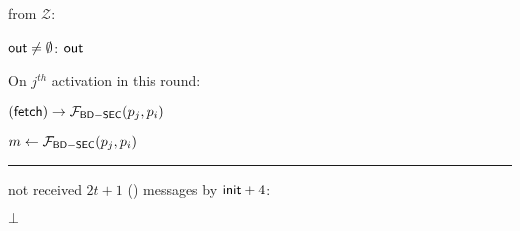 \begin{bbox}[title={$\Pi_{\msf{Bracha}} (\mathcal{D}, \mathcal{P} = p_1,...,p_n)$ in $\F_{\msf{BD-SEC}}$-hybrid}]
\OnInput {} from $\mathcal{Z}$:

	\quad \If ${\mathsf {out}} \neq \emptyset$: \Output ${\mathsf {out}}$ 

	\quad \Else On $j^{th}$ activation in this round:

		\quad \quad \Send $({\mathsf {fetch}}) \rightarrow \mathcal{F}_{{\mathsf {BD-SEC}}}(p_j,p_i)$

		\quad \quad $m \leftarrow \mathcal{F}_{{\mathsf {BD-SEC}}}(p_j,p_i)$

\vspace{2mm} \hrule \vspace{2mm}

\If not received $2t + 1$ (\textunderscore) messages by ${\mathsf {init}} + 4$:

	\quad \Output $\bot$

\end{bbox}


